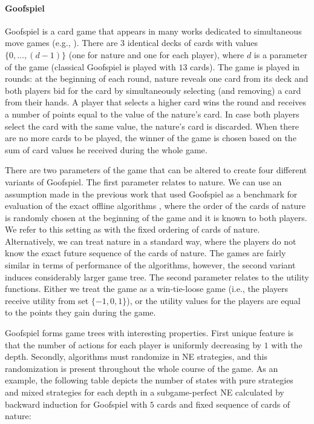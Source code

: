 \paragraph{\textbf{Goofspiel}}
Goofspiel is a card game that appears in many works dedicated to simultaneous move games (e.g., \cite{Ross71Goofspiel,Rhoads12Computer,Saffidine12SMAB,Lanctot13Goofspiel}). 
There are $3$ identical decks of cards with values $\{0,\dots, (d-1)\}$ (one for nature and one for each player), where $d$ is a parameter of the game (classical Goofspiel is played with $13$ cards). 
The game is played in rounds: at the beginning of each round, nature reveals one card from its deck and both players bid for the card by simultaneously selecting (and removing) a card from their hands. 
A player that selects a higher card wins the round and receives a number of points equal to the value of the nature's card. 
In case both players select the card with the same value, the nature's card is discarded. 
When there are no more cards to be played, the winner of the game is chosen based on the sum of card values he received during the whole game. 

There are two parameters of the game that can be altered to create four different variants of Goofspiel.
The first parameter relates to nature. 
We can use an assumption made in the previous work that used Goofspiel as a benchmark for evaluation of the exact offline algorithms \cite{Saffidine12SMAB}, where the order of the cards of nature is randomly chosen at the beginning of the game and it is known to both players. 
We refer to this setting as with the fixed ordering of cards of nature.
Alternatively, we can treat nature in a standard way, where the players do not know the exact future sequence of the cards of nature.
The games are fairly similar in terms of performance of the algorithms, however, the second variant induces considerably larger game tree.
The second parameter relates to the utility functions. 
Either we treat the game as a win-tie-loose game (i.e., the players receive utility from set $\lbrace -1, 0, 1 \rbrace$), or the utility values for the players are equal to the points they gain during the game.

Goofspiel forms game trees with interesting properties. 
First unique feature is that the number of actions for each player is uniformly decreasing by $1$ with the depth.
Secondly, algorithms must randomize in NE strategies, and this randomization is present throughout the whole course of the game.
As an example, the following table depicts the number of states with pure strategies and mixed strategies for each depth in a subgame-perfect NE calculated by backward induction for Goofspiel with $5$ cards and fixed sequence of cards of nature:

